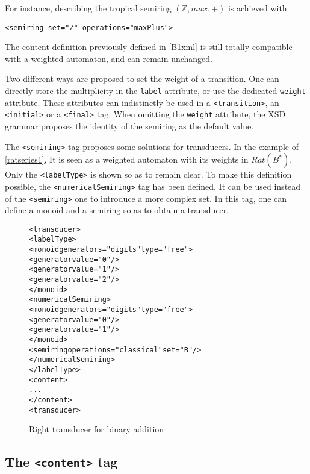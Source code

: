 \documentclass[a4paper]{article}
\newcommand{\xtag}[1]{\texttt{<#1>}}
\newcommand{\xattr}[1]{\texttt{#1}}
\begin{document}
For instance, describing the tropical semiring $({\mathbb Z}, max, +)$
is achieved with:
\begin{center}
{\small
\verb|<semiring set="Z" operations="maxPlus">|}
\end{center}

The content definition previously defined in \autoref{B1xml} is
still totally compatible with a weighted automaton, and can remain
unchanged.

Two different ways are proposed to set the weight of a transition. One
can directly store the multiplicity in the \xattr{label} attribute, or
use the dedicated \xattr{weight} attribute. These attributes can
indistinctly be used in a \xtag{transition}, an \xtag{initial} or a
\xtag{final} tag. When omitting the \xattr{weight} attribute, the XSD
grammar proposes the identity of the semiring as the default value.

\medskip

The \xtag{semiring} tag proposes some solutions for transducers.
In the example of \autoref{ratseries1}, It is seen as a weighted automaton
with its weights in $Rat(B^*)$. Only the \xtag{labelType} is shown so as to
remain clear.
To make this definition possible, the \xtag{numericalSemiring} tag has been
defined. It can be used instead of the \xtag{semiring} one to introduce a more
complex set. In this tag, one can define a monoid and a semiring so as to obtain
a transducer.

\begin{figure}[ht]
  \begin{center}
\begin{alltt}
<transducer>
  <labelType>
    <monoid generators="digits" type="free">
      <generator value="0"/>
      <generator value="1"/>
      <generator value="2"/>
    </monoid>
    <numericalSemiring>
      <monoid generators="digits" type="free">
        <generator value="0"/>
        <generator value="1"/>
      </monoid>
      <semiring operations="classical" set="B"/>
    </numericalSemiring>
  </labelType>
  <content>
    ...
  </content>
<transducer>
\end{alltt}
\caption{Right transducer for binary addition}
\label{ratseries1}
  \end{center}
\end{figure}

\subsection{The \xtag{content} tag}
\end{document}
